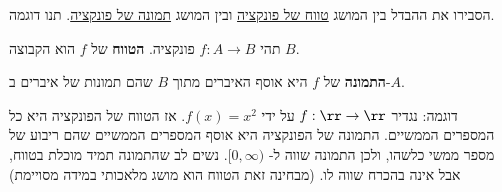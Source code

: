 הסבירו את ההבדל בין המושג
\underline{טווח של פונקציה}
ובין המושג
\underline{תמונה של פונקציה}.
תנו דוגמה.
\begin{solbox}
תהי
$f: A \rightarrow B$
פונקציה.
{\bf
הטווח
}
של $f$ הוא הקבוצה $B$.

{\bf
התמונה
}
של $f$ היא אוסף האיברים מתוך $B$ שהם תמונות של איברים ב-$A$.

דוגמה: נגדיר
$f: \rr \rightarrow \rr$
על ידי
$f(x) = x^2$.
אז הטווח של הפונקציה היא כל המספרים הממשיים. התמונה של הפונקציה היא אוסף המספרים הממשיים שהם ריבוע של מספר ממשי כלשהו, ולכן התמונה שווה ל-
$[0, \infty)$.
נשים לב שהתמונה תמיד מוכלת בטווח, אבל אינה בהכרח שווה לו. (מבחינה זאת הטווח הוא מושג מלאכותי במידה מסויימת)
\end{solbox}
